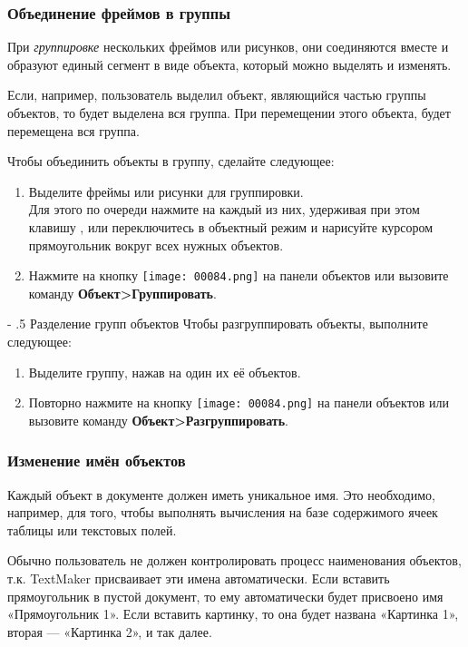 \documentclass[a4paper,10pt]{article}
\makeatletter
\renewcommand\paragraph{%
   \@startsection{paragraph}{4}{0mm}%
      {-\baselineskip}%
      {.5\baselineskip}%
      {\normalfont\normalsize\bfseries}}
\makeatother
\begin{document}
\subsubsection{Объединение фреймов в группы}
При \textit{группировке} нескольких фреймов или рисунков, они соединяются вместе и образуют единый сегмент в виде объекта, который можно выделять и изменять.

Если, например, пользователь выделил объект, являющийся частью группы объектов, то будет выделена вся группа. При перемещении этого объекта, будет перемещена вся группа.

Чтобы объединить объекты в группу, сделайте следующее:

\begin{enumerate}
 \item Выделите фреймы или рисунки для группировки.\\
 Для этого по очереди нажмите на каждый из них, удерживая при этом клавишу , или переключитесь в объектный режим и нарисуйте курсором прямоугольник вокруг всех нужных объектов.
 \item Нажмите на кнопку \texttt{[image: 00084.png]} на панели объектов или вызовите команду \textbf{Объект>Группировать}.
\end{enumerate}

\paragraph{Разделение групп объектов}
Чтобы разгруппировать объекты, выполните следующее:
\begin{enumerate}
 \item Выделите группу, нажав на один их её объектов.
 \item Повторно нажмите на кнопку \texttt{[image: 00084.png]} на панели объектов или вызовите команду \textbf{Объект>Разгруппировать}.
\end{enumerate}

\subsubsection{Изменение имён объектов}
Каждый объект в документе должен иметь уникальное имя. Это необходимо, например, для того, чтобы выполнять вычисления на базе содержимого ячеек таблицы или текстовых полей.

Обычно пользователь не должен контролировать процесс наименования объектов, т.к. TextMaker присваивает эти имена автоматически. Если вставить прямоугольник в пустой документ, то ему автоматически будет присвоено имя «Прямоугольник 1». Если вставить картинку, то она будет названа «Картинка 1», вторая --- «Картинка 2», и так далее.
\end{document}
